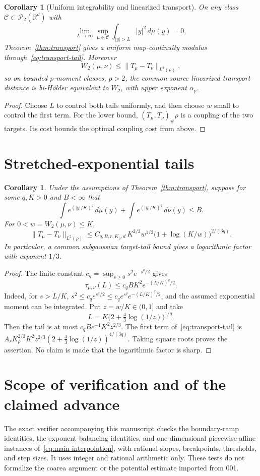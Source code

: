\documentclass[11pt]{article}
\newtheorem{corollary}[theorem]{Corollary}
\theoremstyle{remark}\newtheorem{remark}[theorem]{Remark}
\newcommand{\R}{\mathbb R}\newcommand{\Var}{\operatorname{Var}}
\newcommand{\Ptwo}{\mathcal P_2}\newcommand{\TV}{\operatorname{TV}}
\newcommand{\norm}[1]{\lVert#1\rVert}\newcommand{\ind}{\mathbf 1}
\begin{document}
\begin{corollary}[Uniform integrability and linearized transport]
On any class $\mathcal C\subset\Ptwo(\R^d)$ with
\[
 \lim_{L\to\infty}\sup_{\mu\in\mathcal C}
                  \int_{|y|>L}|y|^2\,d\mu(y)=0,
\]
Theorem~\ref{thm:transport} gives a uniform map-continuity modulus through~\eqref{eq:transport-tail}. Moreover
\[
 W_2(\mu,\nu)\le\norm{T_\mu-T_\nu}_{L^2(\rho)},
\]
so on bounded $p$-moment classes, $p>2$, the common-source linearized transport distance is bi-H\"older equivalent to $W_2$, with upper exponent $\alpha_p$.
\end{corollary}
\begin{proof}
Choose $L$ to control both tails uniformly, and then choose $w$ small to control the first term. For the lower bound, $(T_\mu,T_\nu)_\#\rho$ is a coupling of the two targets. Its cost bounds the optimal coupling cost from above.
\end{proof}

\section{Stretched-exponential tails}
\begin{corollary}\label{cor:exponential}
Under the assumptions of Theorem~\ref{thm:transport}, suppose for some $q,K>0$ and $B<\infty$ that
\[
 \int e^{(|y|/K)^q}\,d\mu(y)+\int e^{(|y|/K)^q}\,d\nu(y)\le B.
\]
For $0<w=W_2(\mu,\nu)\le K$,
\[
 \norm{T_\mu-T_\nu}_{L^2(\rho)}
 \le C_{q,B,r,K_\rho,d}\,K^{2/3}w^{1/3}
                      \bigl(1+\log(K/w)\bigr)^{2/(3q)}.
\]
In particular, a common subgaussian target-tail bound gives a logarithmic factor with exponent $1/3$.
\end{corollary}
\begin{proof}
The finite constant $c_q=\sup_{s\ge0}s^2e^{-s^q/2}$ gives
\[
 \tau_{\mu,\nu}(L)\le c_q B K^2 e^{-(L/K)^q/2}.
\]
Indeed, for $s>L/K$, $s^2\le c_qe^{s^q/2}\le c_qe^{s^q}e^{-(L/K)^q/2}$, and the assumed exponential moment can be integrated. Put $z=w/K\in(0,1]$ and take
\[
 L=K\bigl(2+\tfrac43\log(1/z)\bigr)^{1/q}.
\]
Then the tail is at most $c_qB e^{-1}K^2z^{2/3}$. The first term of~\eqref{eq:transport-tail} is
$A_rK_\rho^{2/3}K^2z^{2/3}(2+\tfrac43\log(1/z))^{4/(3q)}$.
Taking square roots proves the assertion. No claim is made that the logarithmic factor is sharp.
\end{proof}

\section{Scope of verification and of the claimed advance}
The exact verifier accompanying this manuscript checks the boundary-ramp identities, the exponent-balancing identities, and one-dimensional piecewise-affine instances of~\eqref{eq:main-interpolation}, with rational slopes, breakpoints, thresholds, and step sizes. It uses integer and rational arithmetic only. These tests do not formalize the coarea argument or the potential estimate imported from 001.
\end{document}
